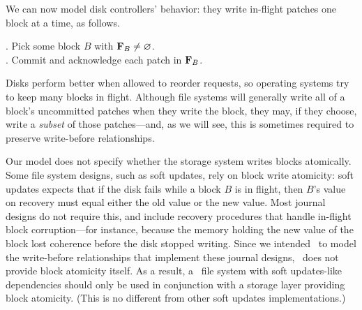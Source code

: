 We can now model disk controllers' behavior: they write in-flight patches one
 block at a time, as follows.
%
\begin{tabbing}
\qquad {}. Pick some block $B$ with $\PInf[B] \neq \emptyset$. \\
\qquad {}. Commit and acknowledge each patch in $\PInf[B]$.
\end{tabbing}
%
\noindent
%
Disks perform better when allowed to reorder requests, so operating systems
 try to keep many blocks in flight.
%
%
Although file systems will generally write all of a block's uncommitted
 patches when they write the block, they may, if they choose, write a
 \emph{subset} of those patches---and, as we will see, this is sometimes
 required to preserve write-before relationships.


Our model does not specify whether the storage system writes blocks
 atomically.
%
Some file system designs, such as soft updates, rely on block write
 atomicity:
%
soft updates expects that if the disk fails while a block $B$ is
 in flight, then $B$'s value on recovery must equal either the old value or
 the new value.
%
Most journal designs do not require this, and include recovery procedures
 that handle in-flight block corruption---for instance, because the memory
 holding the new value of the block lost coherence before the disk stopped
 writing.
%
Since we intended \Kudos\ to model the write-before relationships that
 implement these journal designs, \Kudos\ does not provide block atomicity
 itself.
%
As a result, a \Kudos\ file system with soft updates-like dependencies
 should only be used in conjunction with a storage layer providing block
 atomicity.  (This is no different from other soft updates
 implementations.)


\begin{comment}
This model does not completely define the disk's behavior on system crash,
 in particular with respect to in-flight blocks.
%
%
Most journal designs do not rely on this assumption, and can recover
 properly even if in-flight blocks are corrupted---for instance,
 because the memory holding the new value of the block lost its coherence
 before the disk stopped writing~\cite{nightingale06rethink}.
%
However, some disks may actually provide an atomicity guarantee, for
 instance by using non-volatile memory to store blocks before they make it
 onto disk.
%
The \Kudos\ core makes no assumptions about block atomicity, instead relying
 on software above it to implement a consistency protocol that makes sense
 for the given disk.
\end{comment}


